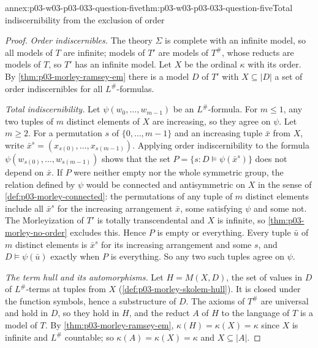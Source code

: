 \begin{annexitem}{annex:p03-w03-p03-033-question-five}{thm:p03-w03-p03-033-question-five}{Total indiscernibility from the exclusion of order}
\begin{proof}
\emph{Order indiscernibles.} The theory \(\Sigma\) is complete with an
infinite model, so all models of \(T\) are infinite; models of \(T'\) are
models of \(T^\#\), whose reducts are models of \(T\), so \(T'\) has an
infinite model. Let \(X\) be the ordinal \(\kappa\) with its order. By
\cref{thm:p03-morley-ramsey-em} there is a model \(D\) of \(T'\) with
\(X\subseteq|D|\) a set of order indiscernibles for all
\(L^\#\)-formulas.

\emph{Total indiscernibility.} Let \(\psi(w_0,\dots,w_{m-1})\) be an
\(L^\#\)-formula. For \(m\leq1\), any two tuples of \(m\) distinct
elements of \(X\) are increasing, so they agree on \(\psi\). Let
\(m\geq2\). For a permutation \(s\) of \(\{0,\dots,m-1\}\) and an
increasing tuple \(\bar x\) from \(X\), write
\(\bar x^s=(x_{s(0)},\dots,x_{s(m-1)})\). Applying order indiscernibility
to the formula \(\psi(w_{s(0)},\dots,w_{s(m-1)})\) shows that the set
\(P=\{s:D\models\psi(\bar x^s)\}\) does not depend on \(\bar x\). If \(P\)
were neither empty nor the whole symmetric group, the relation defined by
\(\psi\) would be connected and antisymmetric on \(X\) in the sense of
\cref{def:p03-morley-connected}: the permutations of any tuple of \(m\)
distinct elements include all \(\bar x^s\) for the increasing
arrangement \(\bar x\), some satisfying \(\psi\) and some not. The
Morleyization of \(T'\) is totally transcendental and \(X\) is infinite,
so \cref{thm:p03-morley-no-order} excludes this. Hence \(P\) is empty or
everything. Every tuple \(\bar u\) of \(m\) distinct elements is
\(\bar x^s\) for its increasing arrangement and some \(s\), and
\(D\models\psi(\bar u)\) exactly when \(P\) is everything. So any two such
tuples agree on \(\psi\).

\emph{The term hull and its automorphisms.} Let \(H=M(X,D)\), the set of
values in \(D\) of \(L^\#\)-terms at tuples from \(X\)
(\cref{def:p03-morley-skolem-hull}). It is closed under the function
symbols, hence a substructure of \(D\). The axioms of \(T^\#\) are
universal and hold in \(D\), so they hold in \(H\), and the reduct \(A\)
of \(H\) to the language of \(T\) is a model of \(T\). By
\cref{thm:p03-morley-ramsey-em}, \(\kappa(H)=\kappa(X)=\kappa\) since
\(X\) is infinite and \(L^\#\) countable; so \(\kappa(A)=\kappa(X)=\kappa\)
and \(X\subseteq|A|\).


\end{proof}
\end{annexitem}
